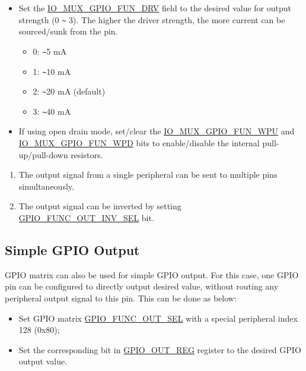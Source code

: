 \documentclass[main\_\_EN.tex]{subfiles}
\begin{document}
\begin{enumerate}
\begin{itemize}
        \item Set the \hyperref[fielddesc:IOMUXGPIONFUNDRV]{IO\_MUX\_GPIO\_FUN\_DRV} field to the desired value for output strength (0 \verb+~+ 3). The higher the driver strength, the more current can be sourced/sunk from the pin.
        \begin{itemize}
            \item 0: \verb+~+5 mA
            \item 1: \verb+~+10 mA
            \item 2: \verb+~+20 mA (default)
            \item 3: \verb+~+40 mA
        \end{itemize}
        \item If using open drain mode, set/clear the \hyperref[fielddesc:IOMUXGPIONFUNWPU]{IO\_MUX\_GPIO\_FUN\_WPU} and \hyperref[fielddesc:IOMUXGPIONFUNWPD]{IO\_MUX\_GPIO\_FUN\_WPD} bits to enable/disable the internal pull-up/pull-down resistors.
    \end{itemize}
\end{enumerate}

\begin{tiplisting}
\vspace{-2em}
\begin{enumerate}
\item \label{output-note-1} The output signal from a single peripheral can be sent to multiple pins simultaneously.
\item \label{output-note-2} The output signal can be inverted by setting \hyperref[fielddesc:GPIOFUNCNOUTINVSEL]{GPIO\_FUNC\_OUT\_INV\_SEL} bit.
\end{enumerate}
\end{tiplisting}

\subsection{Simple GPIO Output}

GPIO matrix can also be used for simple GPIO output. For this case, one GPIO pin can be configured to directly output desired value, without routing any peripheral output signal to this pin. This can be done as below:

\begin{itemize}
    \item Set GPIO matrix \hyperref[fielddesc:GPIOFUNCNOUTSEL]{GPIO\_FUNC\_OUT\_SEL} with a special peripheral index 128 (0x80);
    \item Set the corresponding bit in \hyperref[regdesc:GPIOOUTREG]{GPIO\_OUT\_REG} register to the desired GPIO output value.
\end{itemize}
\end{document}
